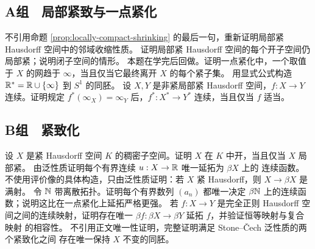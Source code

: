 \subsection*{A组　局部紧致与一点紧化}
\begin{enumerate}[label=\textbf{\thechapter.\arabic*.}]
 不引用命题 \ref{prop:locally-compact-shrinking} 的最后一句，重新证明局部紧
 Hausdorff 空间中的邻域收缩性质。
 证明局部紧 Hausdorff 空间的每个开子空间仍局部紧；说明闭子空间的情形。
 本题在学完后回做。证明一点紧化中，一个取值
 于 \(X\) 的网趋于 \(\infty\)，当且仅当它最终离开 \(X\) 的每个紧子集。
 用显式公式构造 \(\mathbb{R}^*=\mathbb{R}\cup\{\infty\}\) 到 \(S^1\) 的同胚。
 设 \(X,Y\) 是非紧局部紧 Hausdorff 空间，\(f:X\to Y\) 连续。证明规定
 \(f^*(\infty_X)=\infty_Y\) 后，\(f^*:X^*\to Y^*\) 连续，当且仅当
 \(f\) 适当。
\end{enumerate}

\subsection*{B组　紧致化}
\begin{enumerate}[label=\textbf{\thechapter.\arabic*.},resume]
 设 \(X\) 是紧 Hausdorff 空间 \(K\) 的稠密子空间。证明 \(X\) 在 \(K\)
 中开，当且仅当 \(X\) 局部紧。
 由泛性质证明每个有界连续 \(u:X\to\mathbb{R}\) 唯一延拓为 \(\beta X\) 上的
 连续函数。
 不使用评价像的具体构造，只由泛性质证明：若 \(X\) 紧 Hausdorff，则
 \(X\to\beta X\) 是满射。
 令 \(\mathbb{N}\) 带离散拓扑。证明每个有界数列 \( (a_n) \) 都唯一决定
 \(\beta\mathbb{N}\) 上的连续函数；说明这比在一点紧化上延拓严格更强。
 若 \(f:X\to Y\) 是完全正则 Hausdorff 空间之间的连续映射，证明存在唯一
 \(\beta f:\beta X\to\beta Y\) 延拓 \(f\)，并验证恒等映射与复合映射
 的相容性。
 不引用正文唯一性证明，完整证明满足 Stone--Čech 泛性质的两个紧致化之间
 存在唯一保持 \(X\) 不变的同胚。
\end{enumerate}
